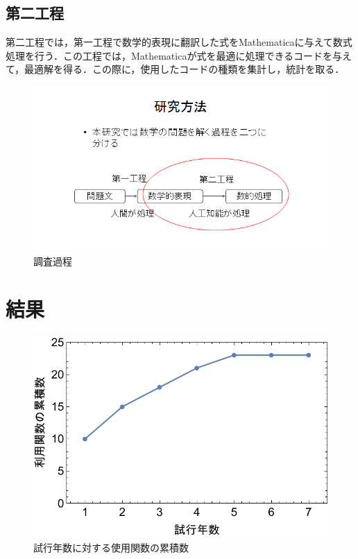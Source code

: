 \section{第二工程}

第二工程では，第一工程で数学的表現に翻訳した式をMathematicaに与えて数式処理を行う．この工程では，Mathematicaが式を最適に処理できるコードを与えて，最適解を得る．この際に，使用したコードの種類を集計し，統計を取る．

\begin{figure}[h]
\centering
\includegraphics[width=15cm]{katei3.png}
\caption{調査過程}\label{図}
\end{figure}


\chapter{結果}

\begin{figure}[tb]
\centering
\includegraphics[scale=1.3]{code.pdf}
\caption{試行年数に対する使用関数の累積数}\label{累積グラフ}
\end{figure}

